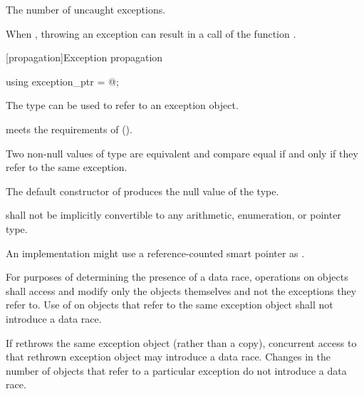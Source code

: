 \begin{itemdescr}
\pnum
\returns
The number of uncaught exceptions.

\pnum
\remarks
When ,
throwing an exception can result in a call of the function
.
\end{itemdescr}

[propagation]{Exception propagation}

%
\begin{itemdecl}
using exception_ptr = @\unspec@;
\end{itemdecl}

\begin{itemdescr}
\pnum
The type  can be used to refer to an exception object.

\pnum
{} meets the requirements of
 ().

\pnum
Two non-null values of type  are equivalent and compare equal if and
only if they refer to the same exception.

\pnum
The default constructor of  produces the null value of the
type.

\pnum
{} shall not be implicitly convertible to any arithmetic,
enumeration, or pointer type.

\pnum
\begin{note}
An implementation might use a reference-counted smart
pointer as .
\end{note}

\pnum
For purposes of determining the presence of a data race, operations on
 objects shall access and modify only the
 objects themselves and not the exceptions they refer to.
Use of  on  objects that refer to
the same exception object shall not introduce a data race.
\begin{note}
If
 rethrows the same exception object (rather than a copy),
concurrent access to that rethrown exception object may introduce a data race.
Changes in the number of  objects that refer to a
particular exception do not introduce a data race.
\end{note}
\end{itemdescr}

